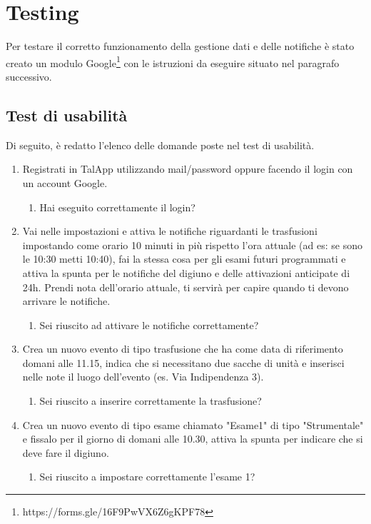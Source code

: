 \documentclass[12pt,a4paper,openright,twoside]{report}
\begin{document}
\chapter{Testing}
Per testare il corretto funzionamento della gestione dati e delle notifiche è stato creato un modulo Google\footnote{https://forms.gle/16F9PwVX6Z6gKPF78} con le istruzioni da eseguire situato nel paragrafo successivo.

\section{Test di usabilità}
Di seguito, è redatto l'elenco delle domande poste nel test di usabilità.

\begin{enumerate}
    \item Registrati in TalApp utilizzando mail/password oppure facendo il login con un account Google.
    \begin{enumerate}
        \item Hai eseguito correttamente il login?
    \end{enumerate}
    
    \item Vai nelle impostazioni e attiva le notifiche riguardanti le trasfusioni impostando come orario 10 minuti in più rispetto l'ora attuale (ad es: se sono le 10:30 metti 10:40), fai la stessa cosa per gli esami futuri programmati e attiva la spunta per le notifiche del digiuno e delle attivazioni anticipate di 24h. Prendi nota dell'orario attuale, ti servirà per capire quando ti devono arrivare le notifiche.
    \begin{enumerate}
        \item Sei riuscito ad attivare le notifiche correttamente?
    \end{enumerate}
    
    \item Crea un nuovo evento di tipo trasfusione che ha come data di riferimento domani alle 11.15, indica che si necessitano due sacche di unità e inserisci nelle note il luogo dell'evento (es. Via Indipendenza 3).
    \begin{enumerate}
        \item Sei riuscito a inserire correttamente la trasfusione?
    \end{enumerate}
    
    \item Crea un nuovo evento di tipo esame chiamato "Esame1" di tipo "Strumentale" e fissalo per il giorno di domani alle 10.30, attiva la spunta per indicare che si deve fare il digiuno.
    \begin{enumerate}
        \item Sei riuscito a impostare correttamente l'esame 1?
    \end{enumerate}
    

\end{enumerate}
\end{document}
